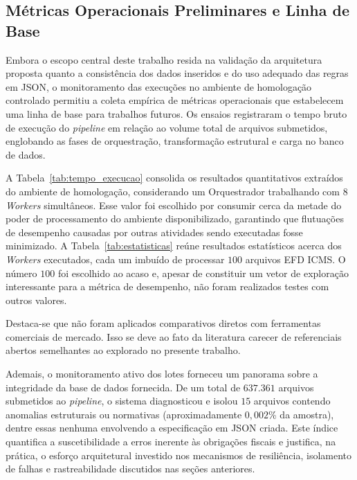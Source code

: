 \subsection{Métricas Operacionais Preliminares e Linha de Base}
\label{sec:numeros_hell_yeah}

Embora o escopo central deste trabalho resida na validação da arquitetura
proposta quanto a consistência dos dados inseridos e do uso adequado das regras
em JSON, o monitoramento das execuções no ambiente de homologação controlado
permitiu a coleta empírica de métricas operacionais que estabelecem
uma linha de base para trabalhos futuros.
Os ensaios registraram o tempo bruto de execução do \textit{pipeline}
em relação ao volume total de arquivos submetidos, englobando as
fases de orquestração, transformação estrutural e
carga no banco de dados.

A Tabela~\ref{tab:tempo_execucao} consolida os resultados quantitativos
extraídos do ambiente de homologação, considerando um Orquestrador trabalhando
com \( 8 \) \textit{Workers} simultâneos. Esse valor foi escolhido por consumir
cerca da metade do poder de processamento do ambiente disponibilizado,
garantindo que flutuações de desempenho causadas por outras atividades sendo
executadas fosse minimizado.
A Tabela~\ref{tab:estatisticas} reúne resultados estatísticos acerca dos
\textit{Workers} executados, cada um imbuído de processar
\( 100 \) arquivos EFD ICMS. O número \( 100 \) foi escolhido ao acaso e,
apesar de constituir um vetor de exploração interessante para a métrica de
desempenho, não foram realizados testes com outros valores.




Destaca-se que não foram aplicados comparativos diretos com ferramentas
comerciais de mercado. Isso se deve ao fato da literatura carecer de
referenciais abertos semelhantes ao explorado no presente trabalho.

Ademais, o monitoramento ativo dos lotes forneceu um panorama sobre a
integridade da base de dados fornecida. De um total de \( 637.361 \) arquivos
submetidos ao \textit{pipeline}, o sistema diagnosticou e isolou \( 15 \)
arquivos contendo anomalias estruturais ou normativas
(aproximadamente \(0{,}002\)\% da amostra), dentre essas nenhuma envolvendo
a especificação em JSON criada. Este índice quantifica a suscetibilidade a
erros inerente às obrigações fiscais e justifica, na prática, o esforço
arquitetural investido nos mecanismos de resiliência, isolamento de
falhas e rastreabilidade discutidos nas seções anteriores.

